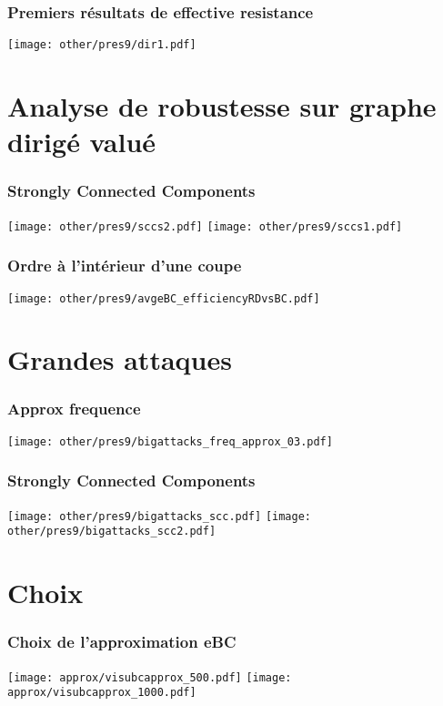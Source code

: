 \documentclass[aspectratio=169]{beamer}
\begin{document}
    \begin{frame}
        \frametitle{Premiers résultats de effective resistance}
        \centering
        \texttt{[image: other/pres9/dir1.pdf]}
    \end{frame}

    \section{Analyse de robustesse sur graphe dirigé valué}
    
    \begin{frame}
        \frametitle{Strongly Connected Components}
        \centering
        \texttt{[image: other/pres9/sccs2.pdf]}
        \texttt{[image: other/pres9/sccs1.pdf]}
    \end{frame}

    \begin{frame}
        \frametitle{Ordre à l'intérieur d'une coupe}
        \centering 
        \texttt{[image: other/pres9/avgeBC\_efficiencyRDvsBC.pdf]}
    \end{frame}
    
    
    \section{Grandes attaques}
    \begin{frame}
        \frametitle{Approx frequence}
        \centering
        \texttt{[image: other/pres9/bigattacks\_freq\_approx\_03.pdf]}
    \end{frame}
    \begin{frame}
        \frametitle{Strongly Connected Components}
        \centering
        \texttt{[image: other/pres9/bigattacks\_scc.pdf]}
        \texttt{[image: other/pres9/bigattacks\_scc2.pdf]}
    \end{frame}
    \section{Choix}
    \begin{frame}
        \frametitle{Choix de l'approximation eBC}
        \texttt{[image: approx/visubcapprox\_500.pdf]}
        \texttt{[image: approx/visubcapprox\_1000.pdf]}
    \end{frame}
\end{document}
